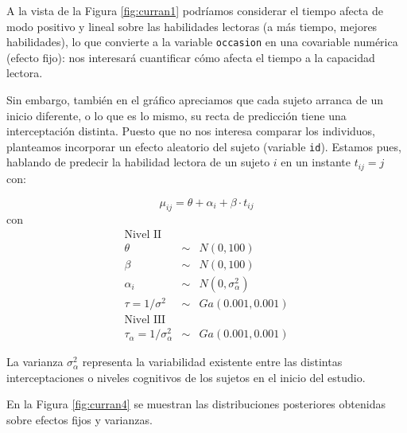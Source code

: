 \documentclass[
]{book}
\begin{document}
A la vista de la Figura \ref{fig:curran1} podríamos considerar el tiempo afecta de modo positivo y lineal sobre las habilidades lectoras (a más tiempo, mejores habilidades), lo que convierte a la variable \texttt{occasion} en una covariable numérica (efecto fijo): nos interesará cuantificar cómo afecta el tiempo a la capacidad lectora.

Sin embargo, también en el gráfico apreciamos que cada sujeto arranca de un inicio diferente, o lo que es lo mismo, su recta de predicción tiene una interceptación distinta. Puesto que no nos interesa comparar los individuos, planteamos incorporar un efecto aleatorio del sujeto (variable \texttt{id}). Estamos pues, hablando de predecir la habilidad lectora de un sujeto \(i\) en un instante \(t_{ij}=j\) con:

\[\mu_{ij}=\theta + \alpha_i + \beta \cdot t_{ij} \]
con
\begin{eqnarray*}
\text{Nivel II} && \\
\theta &\sim & N(0,100) \\
\beta &\sim& N(0,100) \\
\alpha_i &\sim& N(0,\sigma_{\alpha}^2) \\
\tau=1/\sigma^2 &\sim& Ga(0.001,0.001) \\
\text{Nivel III} && \\
\tau_{\alpha}=1/\sigma_{\alpha}^2 &\sim& Ga(0.001,0.001) 
\end{eqnarray*}

La varianza \(\sigma_{\alpha}^2\) representa la variabilidad existente entre las distintas interceptaciones o niveles cognitivos de los sujetos en el inicio del estudio.

En la Figura \ref{fig:curran4} se muestran las distribuciones posteriores obtenidas sobre efectos fijos y varianzas.
\end{document}
